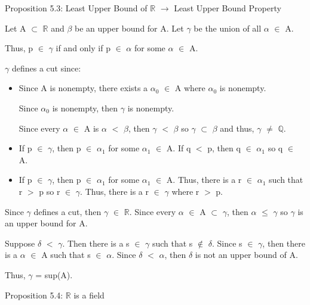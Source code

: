 { \color{blue} Proposition 5.3: Least Upper Bound of $\mathbb{R}$
$\rightarrow$ Least Upper Bound Property } 

	\begin{adjustbox}{minipage=14cm, right, vspace=0.1cm 0cm}
		Let A $\subset$ $\mathbb{R}$ and $\beta$ be an upper bound for A.
		Let $\gamma$ be the union of all $\alpha$ $\in$ A.

		Thus, p $\in$ $\gamma$ if and only if p $\in$ $\alpha$ for some $\alpha$ $\in$ A.

		$\gamma$ defines a cut since:

		\begin{itemize}[leftmargin=1cm, itemsep=0.1cm]
			\item Since A is nonempty, there exists a $\alpha_0$ $\in$ A where $\alpha_0$ is nonempty.

				Since $\alpha_0$ is nonempty, then $\gamma$ is nonempty.

				Since every $\alpha$ $\in$ A is $\alpha$ $<$ $\beta$, then $\gamma$ $<$ $\beta$
				so $\gamma$ $\subset$ $\beta$ and thus, $\gamma$ $\neq$ $\mathbb{Q}$.

			\item If p $\in$ $\gamma$, then p $\in$ $\alpha_1$ for some $\alpha_1$ $\in$ A.
				If q $<$ p, then q $\in$ $\alpha_1$ so q $\in$ A.

			\item If p $\in$ $\gamma$, then p $\in$ $\alpha_1$ for some $\alpha_1$ $\in$ A.
				Thus, there is a r $\in$ $\alpha_1$ such that r $>$ p so r $\in$ $\gamma$.
				Thus, there is a r $\in$ $\gamma$ where r $>$ p.
		\end{itemize}

		Since $\gamma$ defines a cut, then $\gamma$ $\in$ $\mathbb{R}$.
		Since every $\alpha$ $\in$ A $\subset$ $\gamma$, then $\alpha$ $\leq$ $\gamma$
		so $\gamma$ is an upper bound for A.

		Suppose $\delta$ $<$ $\gamma$. Then there is a s $\in$ $\gamma$
		such that s $\not \in$ $\delta$.
		Since s $\in$ $\gamma$, then there is a $\alpha$ $\in$ A such that s $\in$ $\alpha$.
		Since $\delta$ $<$ $\alpha$, then $\delta$ is not an upper bound of A.

		Thus, $\gamma$ = sup(A).
	\end{adjustbox}

\newpage

{ \color{blue} Proposition 5.4: $\mathbb{R}$ is a field} 

